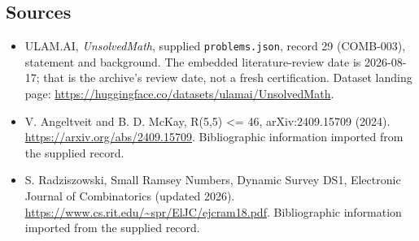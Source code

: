 \documentclass[11pt,a4paper]{article}
\begin{document}
\subsection{Sources}

{\small

\begin{itemize}

\item[\hypertarget{source:29:1}{S1}] ULAM.AI, \emph{UnsolvedMath}, supplied \texttt{problems.json}, record 29 (COMB-003), statement and background. The embedded literature-review date is 2026-08-17; that is the archive’s review date, not a fresh certification. Dataset landing page: \url{https://huggingface.co/datasets/ulamai/UnsolvedMath}.

\item[\hypertarget{source:29:2}{S2}] V. Angeltveit and B. D. McKay, R(5,5) <= 46, arXiv:2409.15709 (2024). \url{https://arxiv.org/abs/2409.15709}. Bibliographic information imported from the supplied record.

\item[\hypertarget{source:29:3}{S3}] S. Radziszowski, Small Ramsey Numbers, Dynamic Survey DS1, Electronic Journal of Combinatorics (updated 2026). \url{https://www.cs.rit.edu/~spr/ElJC/ejcram18.pdf}. Bibliographic information imported from the supplied record.

\end{itemize}

}

\label{end:29}
\end{document}
